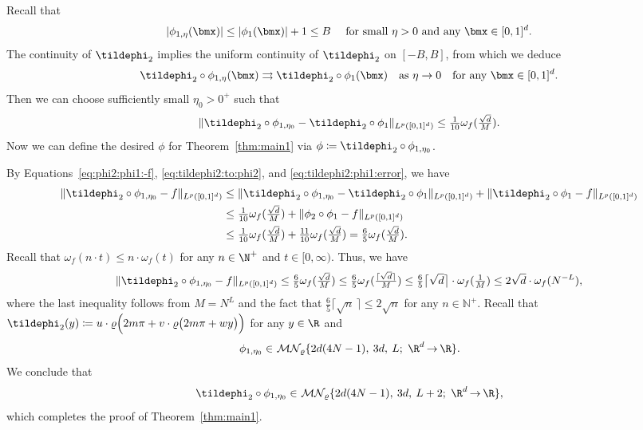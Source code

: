 \documentclass[11pt,a4paper]{article}
\begin{document}
Recall that
\[|\phi_{1,{\eta}}(\bmx) |\le |\phi_1(\bmx)|+1\le B\quad \tn{ for small $\eta>0$ and any $\bmx\in [0,1]^d$}.\]
The continuity of $\tildephi_2$ implies
	the uniform continuity of $\tildephi_2$ on $[-B,B]$, from which we deduce
	\begin{equation*}
		\tildephi_2\circ \phi_{1,{\eta}}(\bmx) 
		\rightrightarrows		
		\tildephi_2\circ\phi_{1}(\bmx)
		\quad \tn{as}\   \eta\to 0 
		\quad \tn{for any $\bmx\in[0,1]^d$}.
	\end{equation*}
    Then we can choose sufficiently small $\eta_0>0^+$ such that
    \begin{equation}
    \label{eq:tildephi2:phi1:error}
        \|\tildephi_2\circ \phi_{1,{\eta_0}}-		
		\tildephi_2\circ\phi_{1}\|_{L^p([0,1]^d)}\le \tfrac{1}{10}\omega_f(\tfrac{\sqrt{d}}{M}).
    \end{equation}
Now we can define the desired $\phi$ for Theorem~\ref{thm:main1} via $\phi\coloneqq \tildephi_2\circ \phi_{1,{\eta_0}}$.

 By Equations~\eqref{eq:phi2:phi1:-f}, \eqref{eq:tildephi2:to:phi2}, and \eqref{eq:tildephi2:phi1:error},
 we have
\begin{equation*}
\begin{split}
\| \tildephi_2\circ \phi_{1,{\eta_0}} -f\|_{L^p([0,1]^d)}
&\le \| \tildephi_2\circ \phi_{1,{\eta_0}} -\tildephi_2\circ \phi_{1 }\|_{L^p([0,1]^d)}+\| \tildephi_2\circ \phi_{1 } -f\|_{L^p([0,1]^d)}
\\&
\le \tfrac{1}{10}\omega_f(\tfrac{\sqrt{d}}{M})+\| \phi_2\circ \phi_1-f\|_{L^p([0,1]^d)}
\\& \le \tfrac{1}{10}\omega_f(\tfrac{\sqrt{d}}{M}) + \tfrac{11}{10}\omega_f(\tfrac{\sqrt{d}}{M})=\tfrac{6}{5}\omega_f(\tfrac{\sqrt{d}}{M}).
\end{split}
\end{equation*}
Recall that  $\omega_f(n\cdot  t)\le n\cdot \omega_f(t)$ for any $n\in\N^+$ and $t\in [0,\infty)$. Thus, we have
	\begin{equation*}
	\begin{split}
	\|  \tildephi_2\circ \phi_{1,{\eta_0}} -f\|_{L^p([0,1]^d)}
 \le  \tfrac{6}{5}\omega_f(\tfrac{\sqrt{d}}{M}) \le \tfrac{6}{5}\omega_f(\tfrac{\lceil\sqrt{d}\rceil}{M}) 
 \le   \tfrac{6}{5}\big\lceil\sqrt{d}\big\rceil\cdot\omega_f(\tfrac{1}{M}) 
 \le 2\sqrt{d}\cdot\omega_f(N^{-L}),
	\end{split}
	\end{equation*}
where the last inequality follows from \(M = N^L\) and the fact that \(\frac{6}{5} \lceil \sqrt{n} \, \rceil \le 2 \sqrt{n}\) for any \(n \in \mathbb{N}^+\).
Recall that $\tildephi_2(y)
   \coloneqq 
   u\cdot \varrho\Big(2m \pi + v \cdot \varrho\big( 2m \pi +   w y \big) \Big)$
   for any $y\in\R$
   and 
	\begin{equation*}
		\phi_{1,\eta_0}\in \mn{\varrho}{2d(4N-1)}{3d}{L}{\R^d}{\R}.
	\end{equation*}
    We conclude that
 	\begin{equation*}
		\tildephi_2\circ \phi_{1,\eta_0}\in \mn{\varrho}{2d(4N-1)}{3d}{L+2}{\R^d}{\R},
	\end{equation*}   
which completes the proof of Theorem~\ref{thm:main1}.
\end{document}
